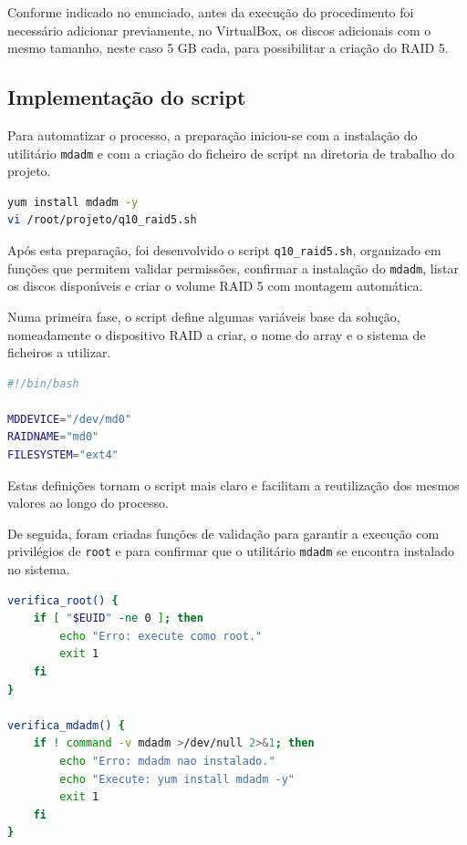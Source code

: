 Conforme indicado no enunciado, antes da execu\c{c}\~ao do procedimento foi necess\'ario adicionar previamente, no VirtualBox, os discos adicionais com o mesmo tamanho, neste caso 5 GB cada, para possibilitar a cria\c{c}\~ao do RAID 5.

\subsection{Implementa\c{c}\~ao do script}

Para automatizar o processo, a prepara\c{c}\~ao iniciou-se com a instala\c{c}\~ao do utilit\'ario \texttt{mdadm} e com a cria\c{c}\~ao do ficheiro de script na diretoria de trabalho do projeto.

\begin{lstlisting}[language=bash,caption={Preparacao inicial da Questao 10}]
yum install mdadm -y
vi /root/projeto/q10_raid5.sh
\end{lstlisting}

Ap\'os esta prepara\c{c}\~ao, foi desenvolvido o script \texttt{q10\_raid5.sh}, organizado em fun\c{c}\~oes que permitem validar permiss\~oes, confirmar a instala\c{c}\~ao do \texttt{mdadm}, listar os discos dispon\'{\i}veis e criar o volume RAID 5 com montagem autom\'atica.

Numa primeira fase, o script define algumas vari\'aveis base da solu\c{c}\~ao, nomeadamente o dispositivo RAID a criar, o nome do array e o sistema de ficheiros a utilizar.

\begin{lstlisting}[language=bash,caption={Definicoes base do script RAID 5}]
#!/bin/bash

MDDEVICE="/dev/md0"
RAIDNAME="md0"
FILESYSTEM="ext4"
\end{lstlisting}

Estas defini\c{c}\~oes tornam o script mais claro e facilitam a reutiliza\c{c}\~ao dos mesmos valores ao longo do processo.

De seguida, foram criadas fun\c{c}\~oes de valida\c{c}\~ao para garantir a execu\c{c}\~ao com privil\'egios de \texttt{root} e para confirmar que o utilit\'ario \texttt{mdadm} se encontra instalado no sistema.

\begin{lstlisting}[language=bash,caption={Validacoes iniciais do script}]
verifica_root() {
    if [ "$EUID" -ne 0 ]; then
        echo "Erro: execute como root."
        exit 1
    fi
}

verifica_mdadm() {
    if ! command -v mdadm >/dev/null 2>&1; then
        echo "Erro: mdadm nao instalado."
        echo "Execute: yum install mdadm -y"
        exit 1
    fi
}
\end{lstlisting}

